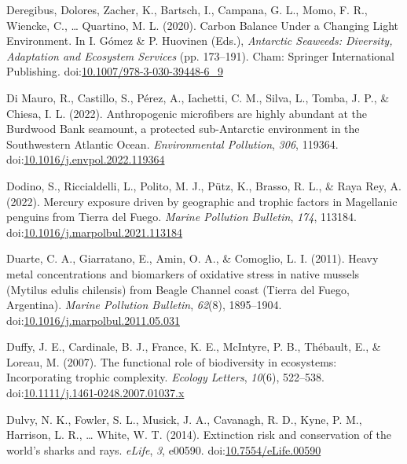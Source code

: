\documentclass[
]{article}
\newlength{\cslhangindent}
\newlength{\cslentryspacingunit} %
\newenvironment{CSLReferences}[2] %
 {%
  \setlength{\parindent}{0pt}
  \ifodd #1
  \let\oldpar\par
  \def\par{\hangindent=\cslhangindent\oldpar}
  \fi
  \setlength{\parskip}{#2\cslentryspacingunit}
 }%
 {}
\begin{document}
\begin{CSLReferences}{1}{0}
\leavevmode{}%
Deregibus, Dolores, Zacher, K., Bartsch, I., Campana, G. L., Momo, F.
R., Wiencke, C., \ldots{} Quartino, M. L. (2020). Carbon {Balance Under}
a {Changing Light Environment}. In I. Gómez \& P. Huovinen (Eds.),
\emph{Antarctic {Seaweeds}: {Diversity}, {Adaptation} and {Ecosystem
Services}} (pp. 173--191). {Cham}: {Springer International Publishing}.
doi:\href{https://doi.org/10.1007/978-3-030-39448-6_9}{10.1007/978-3-030-39448-6\_9}

\leavevmode{}%
Di Mauro, R., Castillo, S., Pérez, A., Iachetti, C. M., Silva, L.,
Tomba, J. P., \& Chiesa, I. L. (2022). Anthropogenic microfibers are
highly abundant at the {Burdwood Bank} seamount, a protected
sub-{Antarctic} environment in the {Southwestern Atlantic Ocean}.
\emph{Environmental Pollution}, \emph{306}, 119364.
doi:\href{https://doi.org/10.1016/j.envpol.2022.119364}{10.1016/j.envpol.2022.119364}

\leavevmode{}%
Dodino, S., Riccialdelli, L., Polito, M. J., Pütz, K., Brasso, R. L., \&
Raya Rey, A. (2022). Mercury exposure driven by geographic and trophic
factors in {Magellanic} penguins from {Tierra} del {Fuego}. \emph{Marine
Pollution Bulletin}, \emph{174}, 113184.
doi:\href{https://doi.org/10.1016/j.marpolbul.2021.113184}{10.1016/j.marpolbul.2021.113184}

\leavevmode{}%
Duarte, C. A., Giarratano, E., Amin, O. A., \& Comoglio, L. I. (2011).
Heavy metal concentrations and biomarkers of oxidative stress in native
mussels ({Mytilus} edulis chilensis) from {Beagle Channel} coast
({Tierra} del {Fuego}, {Argentina}). \emph{Marine Pollution Bulletin},
\emph{62}(8), 1895--1904.
doi:\href{https://doi.org/10.1016/j.marpolbul.2011.05.031}{10.1016/j.marpolbul.2011.05.031}

\leavevmode{}%
Duffy, J. E., Cardinale, B. J., France, K. E., McIntyre, P. B.,
Thébault, E., \& Loreau, M. (2007). The functional role of biodiversity
in ecosystems: Incorporating trophic complexity. \emph{Ecology Letters},
\emph{10}(6), 522--538.
doi:\href{https://doi.org/10.1111/j.1461-0248.2007.01037.x}{10.1111/j.1461-0248.2007.01037.x}

\leavevmode{}%
Dulvy, N. K., Fowler, S. L., Musick, J. A., Cavanagh, R. D., Kyne, P.
M., Harrison, L. R., \ldots{} White, W. T. (2014). Extinction risk and
conservation of the world's sharks and rays. \emph{eLife}, \emph{3},
e00590.
doi:\href{https://doi.org/10.7554/eLife.00590}{10.7554/eLife.00590}


\end{CSLReferences}
\end{document}
